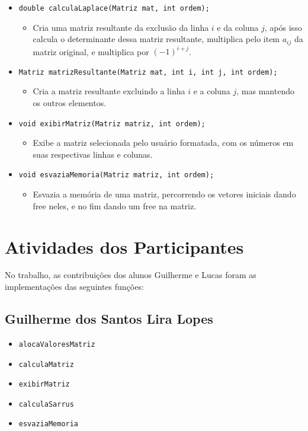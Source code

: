 \documentclass[12pt]{article}
\begin{document}
\begin{itemize}
\begin{itemize}
\[        \right.
        \]
        Depois retorna o valor da subtração de $a$ por $b$ ($a-b$)
    \end{itemize}
    \item \verb|double calculaLaplace(Matriz mat, int ordem);|
    \begin{itemize}
        \item Cria uma matriz resultante da exclusão da linha $i$ e da coluna 
        $j$, após isso calcula o determinante dessa matriz resultante, multiplica 
        pelo item $a_{ij}$ da matriz original, e multiplica por $(-1)^{i + j}$.
    \end{itemize}
    \item \verb|Matriz matrizResultante(Matriz mat, int i, int j, int ordem);|
    \begin{itemize}
        \item Cria a matriz resultante excluindo a linha $i$ e a coluna $j$, mas 
        mantendo os outros elementos.
    \end{itemize}
    \item \verb|void exibirMatriz(Matriz matriz, int ordem);|
    \begin{itemize}
        \item Exibe a matriz selecionada pelo usuário formatada, com os números 
        em suas respectivas linhas e colunas.
    \end{itemize}
    \item \verb|void esvaziaMemoria(Matriz matriz, int ordem);|
    \begin{itemize}
        \item Esvazia a memória de uma matriz, percorrendo os vetores iniciais 
        dando free neles, e no fim dando um free na matriz.
    \end{itemize}
\end{itemize}

\section{Atividades dos Participantes}
No trabalho, as contribuições dos alunos Guilherme e Lucas foram as implementações 
das seguintes funções: 
\subsection{Guilherme dos Santos Lira Lopes}
\begin{itemize}
    \item \verb|alocaValoresMatriz|
    \item \verb|calculaMatriz|  
    \item \verb|exibirMatriz|
    \item \verb|calculaSarrus|
    \item \verb|esvaziaMemoria|
\end{itemize}
\end{document}
